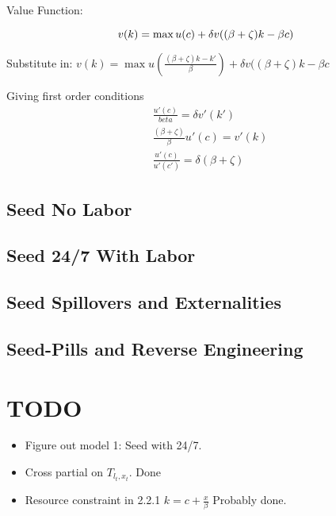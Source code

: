 \documentclass[11pt]{article}
\begin{document}
  Value Function:

  \begin{equation}
    v(k) = \max u(c) + \delta v((\beta + \zeta)k - \beta c)\\
  \end{equation}
  
  Substitute in:
    $v(k) = \max u(\frac{(\beta + \zeta)k - k'}{\beta}) + \delta v((\beta + \zeta)k - \beta c$
    
  Giving first order conditions
  \begin{align}
    &\frac{u'(c)}{beta} = \delta v'(k')\\
    &\frac{(\beta + \zeta)}{\beta} u'(c) = v'(k)\\
    &\frac{u'(c)}{u'(c')} = \delta(\beta + \zeta)
  \end{align}

\subsection{Seed No Labor}
\label{sub:seed_no_labor}

\subsection{Seed 24/7 With Labor}
\label{sub:seed_24_7_with_labor}

\subsection{Seed Spillovers and Externalities}
\label{sub:seed_spillovers_and_externalities}

\subsection{Seed-Pills and Reverse Engineering}
\label{sub:seed_pills_and_reverse_engineering}

\section{TODO}
\label{sec:todo}

  \begin{itemize}
    \item Figure out model 1: Seed with 24/7.
    \item Cross partial on $T_{l_t,x_t}$. Done
    \item Resource constraint in 2.2.1 $k = c + \frac{x}{\beta}$ Probably done.
  \end{itemize}
  
\end{document}
